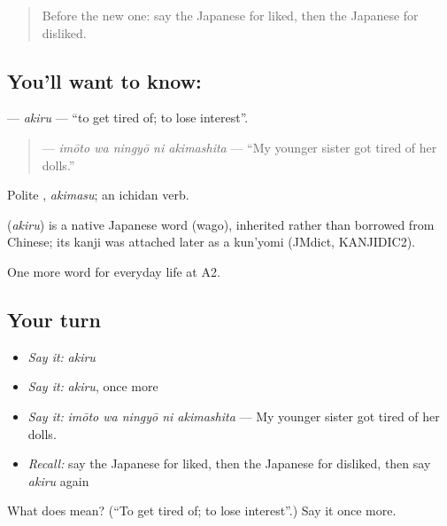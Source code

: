 \label{lesson:JA-C240-akiru}



\begin{quote}
Before the new one: say the Japanese for liked, then the Japanese for disliked.
\end{quote}

\subsection*{You'll want to know: }
\textbf{} — \emph{akiru} — \textquotedblleft{}to get tired of; to lose interest\textquotedblright{}.

\begin{quote}
\textbf{  } — \emph{imōto wa ningyō ni akimashita} — \textquotedblleft{}My younger sister got tired of her dolls.\textquotedblright{}
\end{quote}

Polite \textbf{}, \emph{akimasu}; an ichidan verb.

\begin{cousinweb}
\textbf{} (\emph{akiru}) is a native Japanese word (wago), inherited rather than borrowed from Chinese; its kanji was attached later as a kun'yomi (JMdict, KANJIDIC2).
\end{cousinweb}

\begin{grammarlens}[title={What you've built}]
One more word for everyday life at A2.
\end{grammarlens}

\subsection*{Your turn}
\begin{itemize}
\raggedright
  \item \emph{Say it:} \emph{akiru}
  \item \emph{Say it:} \emph{akiru}, once more
  \item \emph{Say it:} \emph{imōto wa ningyō ni akimashita} — My younger sister got tired of her dolls.
  \item \emph{Recall:} say the Japanese for liked, then the Japanese for disliked, then say \emph{akiru} again
\end{itemize}

\begin{tcolorbox}[breakable,colback=teal!4,colframe=teal!35!black,title={Before you move on}]
What does  mean? (\textquotedblleft{}To get tired of; to lose interest\textquotedblright{}.) Say it once more.
\end{tcolorbox}
